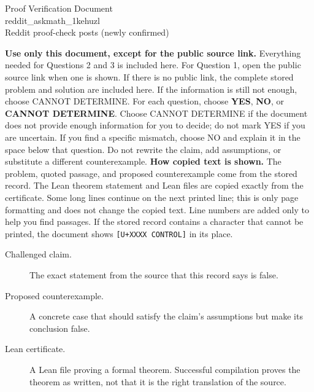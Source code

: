 \documentclass[11pt]{article}
\begin{document}
\begin{center}{\LARGE Proof Verification Document}\\[2pt]{\large reddit\_askmath\_1kehuzl}\\[2pt]{\small Reddit proof-check posts (newly confirmed)}\end{center}
\begin{center}\end{center}
\textbf{Use only this document, except for the public source link.} Everything needed for Questions 2 and 3 is included here. For Question 1, open the public source link when one is shown. If there is no public link, the complete stored problem and solution are included here. If the information is still not enough, choose CANNOT DETERMINE.
For each question, choose \textbf{YES}, \textbf{NO}, or \textbf{CANNOT DETERMINE}. Choose CANNOT DETERMINE if the document does not provide enough information for you to decide; do not mark YES if you are uncertain. If you find a specific mismatch, choose NO and explain it in the space below that question. Do not rewrite the claim, add assumptions, or substitute a different counterexample.
\textbf{How copied text is shown.} The problem, quoted passage, and proposed counterexample come from the stored record. The Lean theorem statement and Lean files are copied exactly from the certificate. Some long lines continue on the next printed line; this is only page formatting and does not change the copied text. Line numbers are added only to help you find passages. If the stored record contains a character that cannot be printed, the document shows \texttt{[U+XXXX CONTROL]} in its place.
\begin{description}
\item[Challenged claim.] The exact statement from the source that this record says is false.
\item[Proposed counterexample.] A concrete case that should satisfy the claim's assumptions but make its conclusion false.
\item[Lean certificate.] A Lean file proving a formal theorem. Successful compilation proves the theorem as written, not that it is the right translation of the source.
\end{description}
\end{document}
